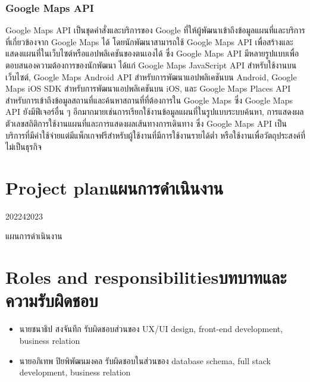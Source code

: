 \subsubsection{Google Maps API~\cite{google_maps_api}}
Google Maps API เป็นชุดคำสั่งและบริการของ Google ที่ให้ผู้พัฒนาเข้าถึงข้อมูลแผนที่และบริการที่เกี่ยวข้องจาก Google Maps ได้ โดยนักพัฒนาสามารถใช้ Google Maps API เพื่อสร้างและแสดงแผนที่ในเว็บไซต์หรือแอปพลิเคชันของตนเองได้ ซึ่ง Google Maps API มีหลายรูปแบบเพื่อตอบสนองความต้องการของนักพัฒนา ได้แก่ Google Maps JavaScript API สำหรับใช้งานบนเว็บไซต์, Google Maps Android API สำหรับการพัฒนาแอปพลิเคชันบน Android, Google Maps iOS SDK สำหรับการพัฒนาแอปพลิเคชันบน iOS, และ Google Maps Places API สำหรับการเข้าถึงข้อมูลสถานที่และค้นหาสถานที่ที่ต้องการใน Google Maps ซึ่ง Google Maps API ยังมีฟีเจอร์อื่น ๆ อีกมากมายเช่นการเรียกใช้งานข้อมูลแผนที่ในรูปแบบระบบค้นหา, การแสดงผลตัวเลขสถิติการใช้งานแผนที่และการแสดงผลเส้นทางการเดินทาง ซึ่ง Google Maps API เป็นบริการที่มีค่าใช้จ่ายแต่มีแพ็กเกจฟรีสำหรับผู้ใช้งานที่มีการใช้งานรายได้ต่ำ หรือใช้งานเพื่อวัตถุประสงค์ที่ไม่เป็นธุรกิจ

\section{\ifenglish Project plan\else แผนการดำเนินงาน\fi}

\begin{plan}{10}{2022}{4}{2023}
    \caption{แผนการดําเนินงาน}
    \label{tab:plan}
\end{plan}

\section{\ifenglish Roles and responsibilities\else บทบาทและความรับผิดชอบ\fi}
\begin{itemize}
    \item นายชนาธิป สงจันทึก รับผิดชอบส่วนของ UX/UI design, front-end development, business relation
    \item นายอภิเทพ ปิยพิพัฒนมงคล รับผิดชอบในส่วนของ database schema, full stack development, business relation
\end{itemize}
